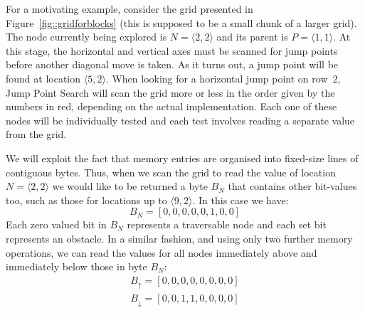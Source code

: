 
For a motivating example, consider the grid presented in 
Figure~\ref{fig::gridforblocks} 
(this is supposed to be a small chunk of a larger grid).  
The node currently being explored is $N = \langle 2,2\rangle$ 
and its parent is $P = \langle 1,1\rangle$.  
At this stage, the horizontal and vertical axes must be scanned 
for jump points before another diagonal move is taken.  
As it turns out, a jump point will be found at location $\langle 5,2\rangle$.  
When looking for a horizontal jump point on row~$2$, Jump Point Search will 
scan the grid more or less in the order given by the numbers in red, 
depending on the actual implementation.  
Each one of these nodes will be individually tested and each test
involves reading a separate value from the grid.

We will exploit the fact that memory entries are organised into fixed-size 
lines of contiguous bytes. Thus, when we scan the grid to read the value of 
location $N = \langle 2, 2\rangle$ we would like to be returned a byte $B_N$
that contains other bit-values too, such as those for locations up to
$\langle 9, 2\rangle$. In this case we have:
\begin{equation}
B_{N} = [0,0,0,0,0,1,0,0]
\end{equation}
Each zero valued bit in $B_N$ represents a traversable node and each set bit
represents an obstacle.
In a similar fashion, and using only two further memory operations, we can read the values for all nodes
immediately above and immediately below those in byte $B_N$:
\begin{gather}
B_{\uparrow} = [0, 0, 0, 0, 0, 0, 0, 0]\\
B_{\downarrow} = [0, 0, 1, 1, 0, 0, 0, 0]
\end{gather}

